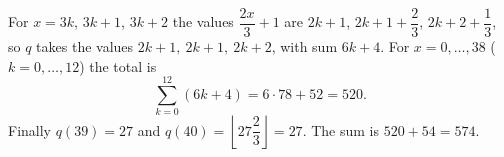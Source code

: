 For $x=3k$, $3k+1$, $3k+2$ the values $\dfrac{2x}{3}+1$ are $2k+1$, $2k+1+\dfrac{2}{3}$, $2k+2+\dfrac{1}{3}$, so $q$ takes the values $2k+1,\ 2k+1,\ 2k+2$, with sum $6k+4$. For $x=0,\dots,38$ ($k=0,\dots,12$) the total is
\[\sum_{k=0}^{12}(6k+4)=6\cdot78+52=520.\]
Finally $q(39)=27$ and $q(40)=\left\lfloor27\dfrac{2}{3}\right\rfloor=27$. The sum is $520+54=\boxed{574}$.
